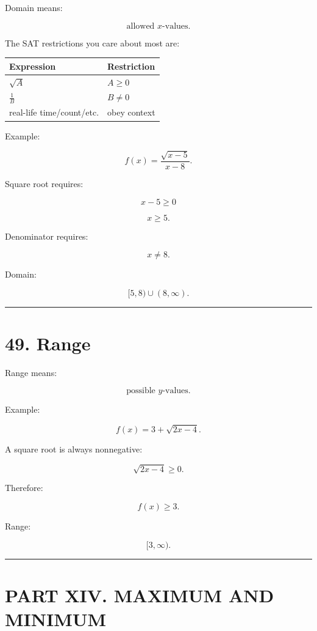\documentclass[
]{article}
\newcounter{none} %
\begin{document}
Domain means:

\[
\boxed{\text{allowed }x\text{-values}}.
\]

The SAT restrictions you care about most are:

{\def\LTcaptype{none} %
\begin{longtable}[]{@{}ll@{}}
\toprule\noalign{}
Expression & Restriction \\
\midrule\noalign{}
\endhead
\bottomrule\noalign{}
\endlastfoot
\(\sqrt{A}\) & \(A\ge0\) \\
\(\frac1B\) & \(B\neq0\) \\
real-life time/count/etc. & obey context \\
\end{longtable}
}

Example:

\[
f(x)=\frac{\sqrt{x-5}}{x-8}.
\]

Square root requires:

\[
x-5\ge0
\]

\[
x\ge5.
\]

Denominator requires:

\[
x\neq8.
\]

Domain:

\[
\boxed{[5,8)\cup(8,\infty)}.
\]

\begin{center}\rule{0.5\linewidth}{0.5pt}\end{center}

\section{49. Range}\label{range}

Range means:

\[
\boxed{\text{possible }y\text{-values}}.
\]

Example:

\[
f(x)=3+\sqrt{2x-4}.
\]

A square root is always nonnegative:

\[
\sqrt{2x-4}\ge0.
\]

Therefore:

\[
f(x)\ge3.
\]

Range:

\[
\boxed{[3,\infty)}.
\]

\begin{center}\rule{0.5\linewidth}{0.5pt}\end{center}

\section{PART XIV. MAXIMUM AND
MINIMUM}\label{part-xiv.-maximum-and-minimum}
\end{document}
